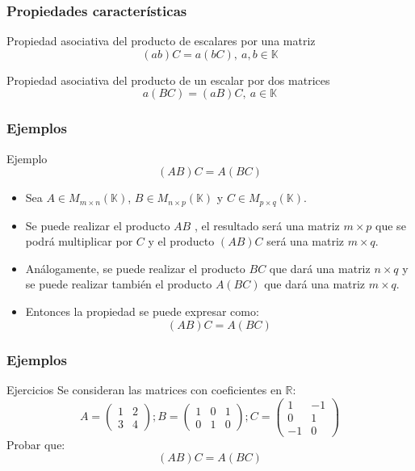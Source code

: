\documentclass[12pt]{article}
\begin{document}
 
    
   \begin{frame}
  \frametitle{Propiedades caracter\'isticas}
  
   \begin{block}{Propiedad asociativa del producto de escalares por una matriz}
   \[(ab)C = a(bC), \ a,b\in\mathbb{K} \]
  \end{block}
  
  
     \begin{block}{Propiedad asociativa del producto de un escalar por dos matrices}
   \[a(BC) = (aB)C, \ a\in\mathbb{K}\]
  \end{block}
  
  
 \end{frame}
 
 
 
   \begin{frame}
  \frametitle{Ejemplos}
  
   \begin{block}{Ejemplo}
   \[(AB)C=A(BC) \]
  \end{block}
   \begin{itemize}

 \item Sea $A\in M_{m\times n}(\mathbb{K})$,  $B\in M_{n\times p}(\mathbb{K})$ y $C\in M_{p\times q}(\mathbb{K})$.
 
 \item Se puede realizar el producto $AB$ , el resultado ser\'a una matriz $m\times p$ que se podr\'a multiplicar por $C$ y el producto $(AB)C$ ser\'a una matriz $m\times q$. 
 
\item  An\'alogamente, se puede realizar el producto $BC$ que dar\'a una matriz $n\times q$ y se puede realizar tambi\'en el producto $A(BC)$ que dar\'a una matriz $m\times q$.
 
 \item Entonces la propiedad se puede expresar como:
     \[(AB)C=A(BC) \]
\end{itemize}
 \end{frame} 
 
 
 
    \begin{frame}
  \frametitle{Ejemplos}
  
   \begin{block}{Ejercicios}
   Se consideran las matrices con coeficientes en $\mathbb{R}$:
  \[ A = \left(\begin{array}{cc}1 & 2 \\3 & 4\end{array}\right);
  B = \left(\begin{array}{ccc}1 & 0 & 1 \\0 & 1 & 0\end{array}\right);
  C = \left(\begin{array}{cc}1 & -1 \\0 & 1 \\-1 & 0\end{array}\right)
  \]
  Probar que:
      \[(AB)C=A(BC) \]

  \end{block}


 \end{frame} 
 
\end{document}
